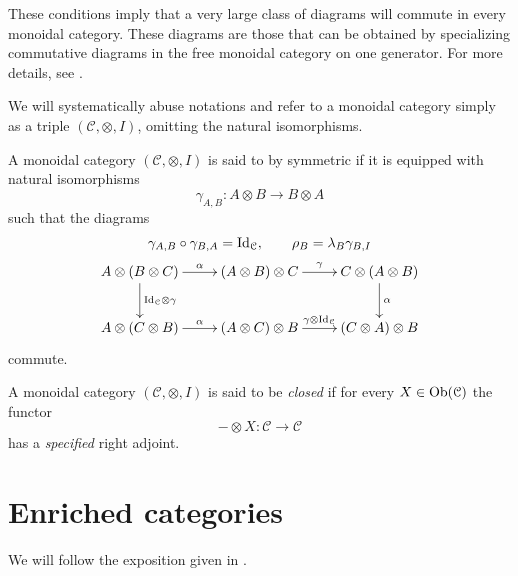 \begin{refsection}
These conditions imply that a very large class of diagrams will commute in every monoidal category. These diagrams are those that can be obtained by specializing commutative diagrams in the free monoidal category on one generator. For more details, see \cite[Ch. VII.2]{cwm}.

\begin{rmk}
We will systematically abuse notations and refer to a monoidal category simply as a triple $(\mathcal C, \otimes, I)$, omitting the natural isomorphisms.
\end{rmk}

\begin{defin}
A monoidal category $(\mathcal C, \otimes, I)$ is said to by symmetric if it is equipped with natural isomorphisms
\[
\gamma_{A,B} \colon A \otimes B \to B \otimes A
\]
such that the diagrams
\begin{gather*}
\gamma_{A,B} \circ \gamma_{B,A} = \mathrm{Id}_{\mathcal C}, \qquad \rho_B = \lambda_B \gamma_{B,I} \\
\xymatrix{
A \otimes (B \otimes C) \ar[r]^-\alpha \ar[d]^{\mathrm{Id}_{\mathcal C} \otimes \gamma} & (A \otimes B) \otimes C \ar[r]^\gamma & C \otimes (A \otimes B) \ar[d]^\alpha \\ A \otimes (C \otimes B) \ar[r]^\alpha & (A \otimes C) \otimes B \ar[r]^{\gamma \otimes \mathrm{Id}_{\mathcal C}} & (C \otimes A) \otimes B
}
\end{gather*}
commute.
\end{defin}

\begin{defin}
A monoidal category $(\mathcal C, \otimes, I)$ is said to be \emph{closed} if for every $X \in \operatorname{Ob}(\mathcal C)$ the functor
\[
- \otimes X \colon \mathcal C \to \mathcal C
\]
has a \emph{specified} right adjoint.
\end{defin}

\section{Enriched categories}

We will follow the exposition given in \cite{kelly}.


\end{refsection}
